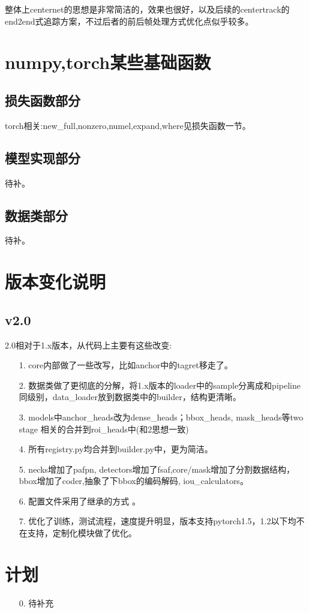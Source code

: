 \documentclass[UTF8]{ctexart}
\begin{document}
整体上centernet的思想是非常简洁的，效果也很好，以及后续的centertrack的end2end式追踪方案，不过后者的前后帧处理方式优化点似乎较多。
\section{numpy,torch某些基础函数}
\label{sec:basefunc}
\subsection{损失函数部分}
torch相关:new\_full,nonzero,numel,expand,where见损失函数一节。
\subsection{模型实现部分}
待补。
\subsection{数据类部分}
待补。

\section{版本变化说明}
\subsection{v2.0}
2.0相对于1.x版本，从代码上主要有这些改变:
\begin{itemize}
	\item[1.] core内部做了一些改写，比如anchor中的tagret移走了。
	\item[2.] 数据类做了更彻底的分解，将1.x版本的loader中的sample分离成和pipeline同级别，data\_loader放到数据类中的builder，结构更清晰。
	\item[3.] models中anchor\_heads改为dense\_heads；bbox\_heads, mask\_heads等two stage 相关的合并到roi\_heads中(和2思想一致)
	\item[4.] 所有registry.py均合并到builder.py中，更为简洁。
	\item[5.] necks增加了pafpn, detectors增加了fsaf,core/mask增加了分割数据结构，bbox增加了coder,抽象了下bbox的编码解码, iou\_calculators。
	\item[6.] 配置文件采用了继承的方式 。
	\item[7.] 优化了训练，测试流程，速度提升明显，版本支持pytorch1.5，1.2以下均不在支持，定制化模块做了优化。
\end{itemize}

\section{计划}
\begin{itemize}
	\item [0.]  待补充
\end{itemize}
\end{document}
